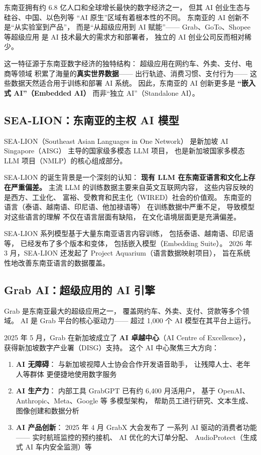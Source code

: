 东南亚拥有约 6.8 亿人口和全球增长最快的数字经济之一，
但其 AI 创业生态与硅谷、中国、以色列等
``AI 原生''区域有着根本性的不同。
东南亚的 AI 创新不是``从实验室到产品''，
而是``从超级应用到 AI 赋能''——
Grab、GoTo、Shopee 等超级应用
是 AI 技术最大的需求方和部署者，
独立的 AI 创业公司反而相对稀少。

这一特征源于东南亚数字经济的独特结构：
超级应用在网约车、外卖、支付、电商等领域
积累了海量的\textbf{真实世界数据}——
出行轨迹、消费习惯、支付行为——
这些数据天然适合用于训练和部署 AI 系统。
因此，东南亚的 AI 创新更多是
\textbf{``嵌入式 AI''（Embedded AI）}
而非``独立 AI''（Standalone AI）。

\subsection{SEA-LION：东南亚的主权 AI 模型}

SEA-LION（Southeast Asian Languages in One Network）
是新加坡 AI Singapore（AISG）
主导的国家级多模态 LLM 项目，
也是新加坡国家多模态 LLM 项目（NMLP）的核心组成部分。

SEA-LION 的诞生背景是一个深刻的认知：
\textbf{现有 LLM 在东南亚语言和文化上存在严重偏差。}
主流 LLM 的训练数据主要来自英文互联网内容，
这些内容反映的是西方、工业化、
富裕、受教育和民主化（WIRED）社会的价值观。
东南亚的语言（泰语、越南语、印尼语、他加禄语等）
在训练数据中严重不足，
导致模型对这些语言的理解
不仅在语言层面有缺陷，
在文化语境层面更是充满偏差。

SEA-LION 系列模型基于大量东南亚语言内容训练，
包括泰语、越南语、印尼语等，
已经发布了多个版本和变体，
包括嵌入模型（Embedding Suite）。
2026 年 3 月，SEA-LION 还发起了
Project Aquarium（语言数据映射项目），
旨在系统性地改善东南亚语言的数据覆盖。

\subsection{Grab AI：超级应用的 AI 引擎}

Grab 是东南亚最大的超级应用之一，
覆盖网约车、外卖、支付、贷款等多个领域。
AI 是 Grab 平台的核心驱动力——
超过 1,000 个 AI 模型在其平台上运行。

2025 年 5 月，Grab 在新加坡成立了
\textbf{AI 卓越中心}（AI Centre of Excellence），
获得新加坡数字产业署（DISG）支持。
这个 AI 中心聚焦三大方向：
\begin{enumerate}[noitemsep]
  \item \textbf{AI 无障碍}：
        与新加坡视障人士协会合作开发语音助手，
        让残障人士、老年人等群体
        更便捷地使用数字服务
  \item \textbf{AI 生产力}：
        内部工具 GrabGPT 已有约 6,400 月活用户，
        基于 OpenAI、Anthropic、Meta、Google 等
        多模型架构，
        帮助员工进行研究、文本生成、图像创建和数据分析
  \item \textbf{AI 产品创新}：
        2025 年 4 月 GrabX 大会发布了
        一系列 AI 驱动的消费者功能——
        实时航班监控的预约接机、
        AI 优化的大订单分配、
        AudioProtect（生成式 AI 车内安全监测）等
\end{enumerate}

